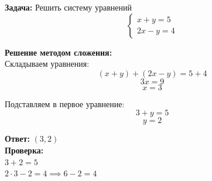 \documentclass[12pt]{article}
\begin{document}
\noindent \textbf{Задача:} Решить систему уравнений
\[
\begin{cases}
x + y = 5 \\
2x - y = 4
\end{cases}
\]

\noindent \textbf{Решение методом сложения:} \\

\noindent Складываем уравнения:
\[
(x + y) + (2x - y) = 5 + 4
\]
\[
3x = 9
\]
\[
x = 3
\]

\noindent Подставляем в первое уравнение:
\[
3 + y = 5
\]
\[
y = 2
\]

\noindent \textbf{Ответ:} $(3, 2)$ \\

\noindent \textbf{Проверка:} \\
$3 + 2 = 5$ \\
$2 \cdot 3 - 2 = 4 \implies 6 - 2 = 4$ 
\end{document}
